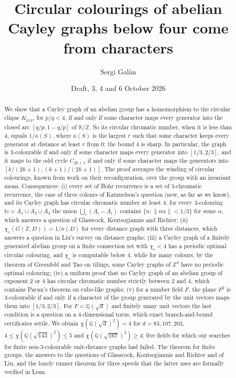 \documentclass[11pt,a4paper]{amsart}
\title{Circular colourings of abelian Cayley graphs below four come from characters}
\author{Sergi Gal\'an}
\date{Draft, 3, 4 and 6 October 2026}
\theoremstyle{definition}
\newcommand{\Q}{\mathbb{Q}}
\newcommand{\R}{\mathbb{R}}
\newcommand{\Z}{\mathbb{Z}}
\newcommand{\RZ}{\R/\Z}
\begin{document}
\begin{abstract}
We show that a Cayley graph of an abelian group has a homomorphism to the circular clique $K_{p/q}$, for
$p/q<4$, if and only if some character maps every generator into the closed arc $[q/p,1-q/p]$ of $\RZ$. So its
circular chromatic number, when it is less than $4$, equals $1/\kappa(S)$, where $\kappa(S)$ is the largest $r$ such
that some character keeps every generator at distance at least $r$ from $0$; the bound $4$ is sharp. In particular, the
graph is $3$-colourable if and only if some character maps every generator into $[1/3,2/3]$, and it maps to the odd
cycle $C_{2k+1}$ if and only if some character maps the generators into $[k/(2k+1),(k+1)/(2k+1)]$. The proof averages
the winding of circular colourings, known from work on their reconfiguration, over the group with an invariant
mean. Consequences: (i) every set of Bohr recurrence is a set of
$3$-chromatic recurrence, the case of three colours of Katznelson's question (new, as far as we know), and its
Cayley graph has circular
chromatic number at least $4$; for every $3$-colouring $\mathbb N=A_1\cup A_2\cup A_3$ the union
$\bigcup_i(A_i-A_i)$ contains $\{n:\|n\alpha\|<1/3\}$ for some $\alpha$, which answers a question of Glasscock,
Koutsogiannis and Richter; (ii) $\chi_c(G(\Z,D))=1/\kappa(D)$ for every distance graph with three distances, which
answers a question in Liu's survey on distance graphs; (iii) a Cayley graph of a finitely generated abelian group on
a finite connection set with $\chi_c<4$ has a periodic optimal circular colouring, and $\chi_c$ is computable below
$4$, while for many colours, by the theorem of Greenfeld and Tao on tilings, some Cayley graphs of $\Z^d$ have no
periodic optimal colouring; (iv) a uniform proof that no Cayley graph of an abelian group of exponent $2$ or $4$
has circular chromatic number strictly between $2$ and $4$, which contains Payan's theorem on cube-like graphs; (v) for a number
field $F$, the plane $F^2$ is $3$-colourable if and only if a character of the group generated by the unit vectors
maps them into $[1/3,2/3]$. For $F=\Q(\sqrt d)$ and finitely many unit vectors the last condition is a question on a
$4$-dimensional torus, which exact branch-and-bound certificates settle. We obtain $\chi(\Q(\sqrt d)^2)=4$ for
$d=83,107,203$, $4\le\chi(\Q(\sqrt{143})^2)\le5$ and $\chi(\Q(\sqrt{167})^2)\ge4$: five fields for which our searches
for finite non-$3$-colourable unit-distance graphs had failed. The theorem for finite groups, the answers to the
questions of Glasscock, Koutsogiannis and Richter and of Liu, and the lonely runner theorem for three speeds that the
latter uses are formally verified in Lean.
\end{abstract}
\end{document}
